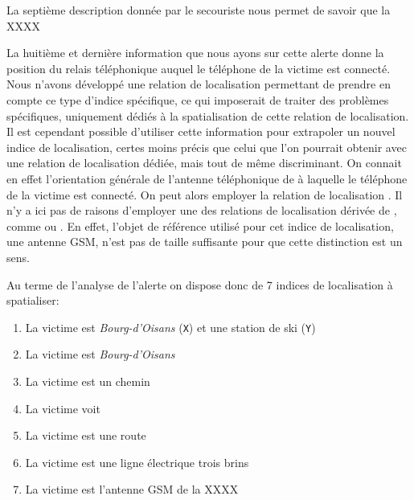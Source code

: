 La septième description donnée par le secouriste nous permet de savoir
que la XXXX


La huitième et dernière information que nous ayons sur cette alerte
donne la position du relais téléphonique auquel le téléphone de la
victime est connecté. Nous n'avons développé une relation de
localisation permettant de prendre en compte ce type d'indice
spécifique, ce qui imposerait de traiter des problèmes spécifiques,
uniquement dédiés à la spatialisation de cette relation de
localisation.
%
Il est cependant possible d'utiliser cette information pour extrapoler
un nouvel indice de localisation, certes moins précis que celui que
l'on pourrait obtenir avec une relation de localisation dédiée, mais
tout de même discriminant.
%
On connait en effet l'orientation générale de l'antenne téléphonique
de à laquelle le téléphone de la victime est connecté.
%
On peut alors employer la relation de localisation
. Il n'y a ici pas de raisons d'employer une
des relations de localisation dérivée de ,
comme  ou
. En effet, l'objet de référence
utilisé pour cet indice de localisation, une antenne GSM, n'est pas de
taille suffisante pour que cette distinction est un sens.



Au terme de l'analyse de l'alerte on dispose donc de 7 indices de
localisation à spatialiser:
% 
\begin{enumerate}
\item \label{ind:fr1} La victime est
  \emph{Bourg-d'Oisans} (\texttt{X}) et une station de ski
  (\texttt{Y})
\item \label{ind:fr2} La victime est
   \emph{Bourg-d'Oisans} 
\item \label{ind:fr3} La victime est  un
  chemin
\item \label{ind:fr4} La victime voit
\item \label{ind:fr5} La victime est  une
  route
\item \label{ind:fr6} La victime est  une
  ligne électrique trois brins
\item \label{ind:fr7} La victime est 
  l'antenne GSM de la XXXX
\end{enumerate}

